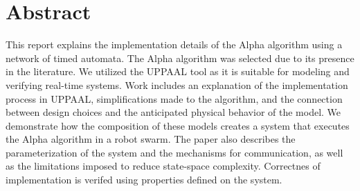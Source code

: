 \section{Abstract}
This report explains the implementation details of the Alpha algorithm using a network of timed automata. The Alpha algorithm was selected due to its presence in the literature. We utilized the UPPAAL tool as it is suitable for modeling and verifying real-time systems. Work includes an explanation of the implementation process in UPPAAL, simplifications made to the algorithm, and the connection between design choices and the anticipated physical behavior of the model. We demonstrate how the composition of these models creates a system that executes the Alpha algorithm in a robot swarm. The paper also describes the parameterization of the system and the mechanisms for communication, as well as the limitations imposed to reduce state-space complexity. Correctnes of implementation is verifed using properties defined on the system.